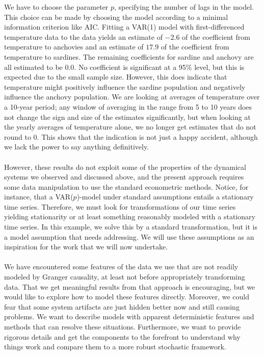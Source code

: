 \documentclass[11pt, a4paper]{memoir}
\theoremstyle{break}
\theoremstyle{break}
\theoremstyle{nonumberplain}
\begin{document}
We have to choose the parameter $p$, specifying the number of lags in the model. This choice can be made by choosing the model according to a minimal information criterion like AIC. Fitting a VAR(1) model with first-differenced temperature data to the data yields an estimate of $-2.6$ of the coefficient from temperature to anchovies and an estimate of $17.9$ of the coefficient from temperature to sardines. The remaining coefficients for sardine and anchovy are all estimated to be $0.0$. No coefficient is significant at a 95\% level, but this is expected due to the small sample size. However, this does indicate that temperature might positively influence the sardine population and negatively influence the anchovy population. We are looking at averages of temperature over a 10-year period; any window of averaging in the range from 5 to 10 years does not change the sign and size of the estimates significantly, but when looking at the yearly averages of temperature alone, we no longer get estimates that do not round to 0. This shows that the indication is not just a happy accident, although we lack the power to say anything definitively.\\\\ 
However, these results do not exploit some of the properties of the dynamical systems we observed and discussed above, and the present approach requires some data manipulation to use the standard econometric methods. Notice, for instance, that a VAR($p$)-model under standard assumptions entails a stationary time series. Therefore, we must look for transformations of our time series yielding stationarity or at least something reasonably modeled with a stationary time series. In this example, we solve this by a standard transformation, but it is a model assumption that needs addressing. We will use these assumptions as an inspiration for the work that we will now undertake.\\\\
We have encountered some features of the data we use that are not readily modeled by Granger causality, at least not before appropriately transforming data. That we get meaningful results from that approach is encouraging, but we would like to explore how to model these features directly. Moreover, we could fear that some system artifacts are just hidden better now and still causing problems. We want to describe models with apparent deterministic features and methods that can resolve these situations. Furthermore, we want to provide rigorous details and get the components to the forefront to understand why things work and compare them to a more robust stochastic framework.
\end{document}
